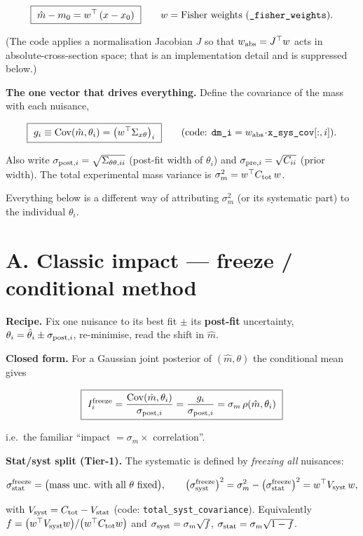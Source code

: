 \documentclass[11pt,a4paper]{article}
\newcommand{\code}[1]{\texttt{#1}}
\begin{document}
\[
\boxed{\ \hat m - m_0 = w^\top\,(x-x_0)\ }\qquad
w=\text{Fisher weights (\code{\_fisher\_weights})}.
\]

(The code applies a normalisation Jacobian $J$ so that $w_{\rm abs}=J^\top w$ acts
in absolute-cross-section space; that is an implementation detail and is
suppressed below.)

\textbf{The one vector that drives everything.} Define the covariance of the mass
with each nuisance,

\[
\boxed{\ g_i \equiv \mathrm{Cov}(\hat m,\theta_i) = \big(w^\top \Sigma_{x\theta}\big)_i\ }
\qquad (\text{code: } \code{dm\_i} = w_{\rm abs}\!\cdot\!\code{x\_sys\_cov}[:,i]).
\]

Also write $\sigma_{{\rm post},i}=\sqrt{\Sigma_{\theta\theta,ii}}$ (post-fit width
of $\theta_i$) and $\sigma_{{\rm pre},i}=\sqrt{C_{ii}}$ (prior width). The total
experimental mass variance is $\sigma_m^2 = w^\top C_{\rm tot}\,w$.

Everything below is a different way of attributing $\sigma_m^2$ (or its
systematic part) to the individual $\theta_i$.

\section*{A. Classic impact --- freeze / conditional method}

\textbf{Recipe.} Fix one nuisance to its best fit $\pm$ its \textbf{post-fit}
uncertainty, $\theta_i=\hat\theta_i\pm\sigma_{{\rm post},i}$, re-minimise, read the
shift in $\hat m$.

\textbf{Closed form.} For a Gaussian joint posterior of $(\hat m,\theta)$ the
conditional mean gives

\[
\boxed{\ I^{\rm freeze}_i=\frac{\mathrm{Cov}(\hat m,\theta_i)}{\sigma_{{\rm post},i}}
=\frac{g_i}{\sigma_{{\rm post},i}}=\sigma_m\,\rho(\hat m,\theta_i)\ }
\]

i.e.\ the familiar ``impact $=\sigma_m\times$ correlation''.

\textbf{Stat/syst split (Tier-1).} The systematic is defined by \emph{freezing
all} nuisances:

\[
\sigma_{\rm stat}^{\rm freeze}=\big(\text{mass unc.\ with all }\theta\text{ fixed}\big),\qquad
\big(\sigma_{\rm syst}^{\rm freeze}\big)^2=\sigma_m^2-\big(\sigma_{\rm stat}^{\rm freeze}\big)^2
= w^\top V_{\rm syst}\,w,
\]

with $V_{\rm syst}=C_{\rm tot}-V_{\rm stat}$ (code:
\texttt{total\_\allowbreak syst\_\allowbreak covariance}).
Equivalently $f=\big(w^\top V_{\rm syst} w\big)/\big(w^\top C_{\rm tot} w\big)$ and
$\sigma_{\rm syst}=\sigma_m\sqrt{f}$, $\sigma_{\rm stat}=\sigma_m\sqrt{1-f}$.
\end{document}

